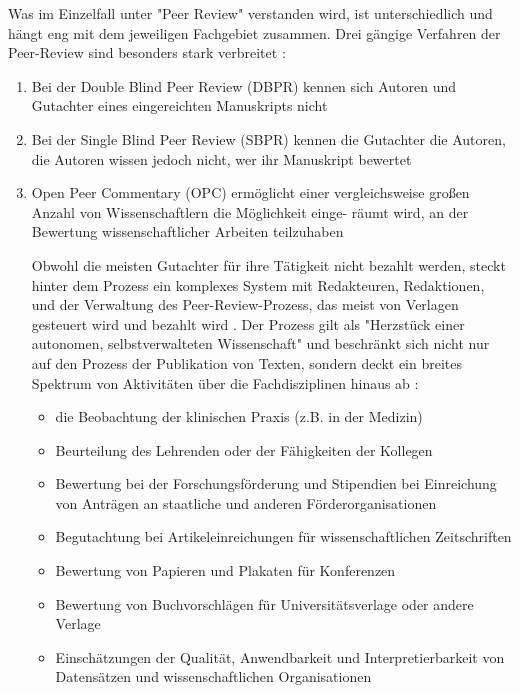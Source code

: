 Was im Einzelfall unter "Peer Review" verstanden wird, ist unterschiedlich und hängt eng mit dem jeweiligen Fachgebiet zusammen. Drei gängige Verfahren der Peer-Review sind besonders stark verbreitet \cite{mueller_2009_peerreview}:
\begin{enumerate}
\item Bei der Double Blind Peer Review (DBPR) kennen sich Autoren und Gutachter eines eingereichten Manuskripts nicht
\item Bei der Single Blind Peer Review (SBPR) kennen die Gutachter die Autoren, die Autoren wissen jedoch nicht, wer ihr Manuskript bewertet
\item Open Peer Commentary (OPC) ermöglicht einer vergleichsweise großen Anzahl von Wissenschaftlern die Möglichkeit einge-
räumt wird, an der Bewertung wissenschaftlicher Arbeiten teilzuhaben
\begin{end}

Obwohl die meisten Gutachter für ihre Tätigkeit nicht bezahlt werden, steckt hinter dem Prozess ein komplexes System mit Redakteuren, Redaktionen, und der Verwaltung des Peer-Review-Prozess, das meist von Verlagen gesteuert wird und bezahlt wird \cite{mueller_2009_peerreview} \cite{Baggs_2006}. Der Prozess gilt als "Herzstück einer autonomen, selbstverwalteten Wissenschaft" \cite{suchen_Hornbostel_2006} und beschränkt sich nicht nur auf den Prozess der Publikation von Texten, sondern deckt ein breites Spektrum von Aktivitäten über die Fachdisziplinen hinaus ab \cite{Lee_2012} \cite{mueller_2009_peerreview}:
\begin{itemize}
\item die Beobachtung der klinischen Praxis (z.B. in der Medizin)
\item Beurteilung des Lehrenden oder der Fähigkeiten der Kollegen
\item Bewertung bei der Forschungsförderung und Stipendien bei Einreichung von Anträgen an staatliche und anderen Förderorganisationen
\item Begutachtung bei Artikeleinreichungen für wissenschaftlichen Zeitschriften
\item Bewertung von Papieren und Plakaten für Konferenzen
\item Bewertung von Buchvorschlägen für Universitätsverlage oder andere Verlage
\item Einschätzungen der Qualität, Anwendbarkeit und Interpretierbarkeit von Datensätzen und wissenschaftlichen Organisationen
\end{itemize}


\end{end}
\end{enumerate}

